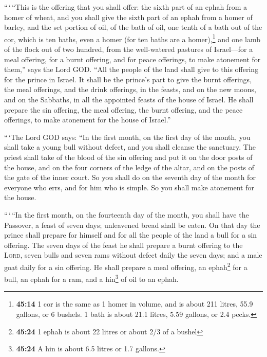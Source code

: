  ``\,`\,``This is the offering that you shall offer: the
sixth part of an ephah from a homer of wheat, and you shall give the
sixth part of an ephah from a homer of barley,  and the
set portion of oil, of the bath of oil, one tenth of a bath out of the
cor, which is ten baths, even a homer (for ten baths are a
homer),\footnote{\textbf{45:14} 1 cor is the same as 1 homer in volume,
  and is about 211 litres, 55.9 gallons, or 6 bushels. 1 bath is about
  21.1 litres, 5.59 gallons, or 2.4 pecks.}  and one lamb
of the flock out of two hundred, from the well-watered pastures of
Israel---for a meal offering, for a burnt offering, and for peace
offerings, to make atonement for them,'' says the Lord GOD.
 ``All the people of the land shall give to this offering
for the prince in Israel.  It shall be the prince's part
to give the burnt offerings, the meal offerings, and the drink
offerings, in the feasts, and on the new moons, and on the Sabbaths, in
all the appointed feasts of the house of Israel. He shall prepare the
sin offering, the meal offering, the burnt offering, and the peace
offerings, to make atonement for the house of Israel.''

 ``\,`The Lord GOD says: ``In the first month, on the
first day of the month, you shall take a young bull without defect, and
you shall cleanse the sanctuary.  The priest shall take
of the blood of the sin offering and put it on the door posts of the
house, and on the four corners of the ledge of the altar, and on the
posts of the gate of the inner court.  So you shall do on
the seventh day of the month for everyone who errs, and for him who is
simple. So you shall make atonement for the house.

 ``\,`\,``In the first month, on the fourteenth day of
the month, you shall have the Passover, a feast of seven days;
unleavened bread shall be eaten.  On that day the prince
shall prepare for himself and for all the people of the land a bull for
a sin offering.  The seven days of the feast he shall
prepare a burnt offering to the \textsc{Lord}, seven bulls and seven
rams without defect daily the seven days; and a male goat daily for a
sin offering.  He shall prepare a meal offering, an
ephah\footnote{\textbf{45:24} 1 ephah is about 22 litres or about 2/3 of
  a bushel} for a bull, an ephah for a ram, and a hin\footnote{\textbf{45:24}
  A hin is about 6.5 litres or 1.7 gallons.} of oil to an ephah.

